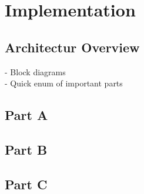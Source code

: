 
\section{Implementation}
\subsection{Architectur Overview}
     - Block diagrams\\
     - Quick enum of important parts
\subsection{Part A}
\subsection{Part B}
\subsection{Part C}

